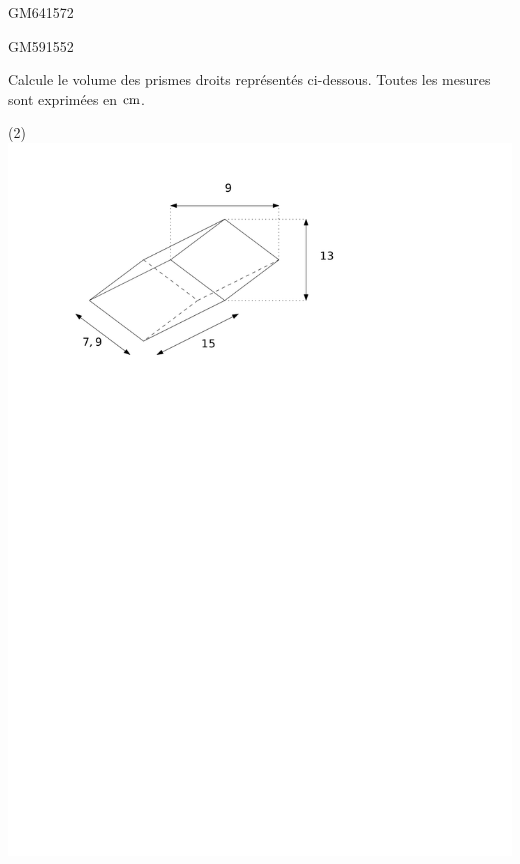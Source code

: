 \documentclass[a4paper,11pt]{report}
\begin{document}
\begin{exol}{GM64}{157}{2}
\end{exol}

\begin{exol}{GM59}{155}{2}
\end{exol}


\begin{exop}{
Calcule le volume des prismes droits représentés ci-dessous. Toutes les mesures sont exprimées en $\tunit{}{\centi m}$.

\begin{tasks}(2)
    \task ~\\ \includegraphics[scale=0.5]{media/gm-02/prisme-los.pdf}

\end{tasks}}
\end{exop}
\end{document}
